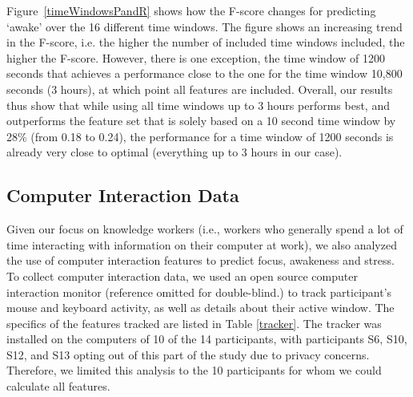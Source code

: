 Figure~\ref{timeWindowsPandR} shows how the F-score changes for predicting `awake' over the 16 different time windows. The figure shows an increasing trend in the F-score, i.e. the higher the number of included time windows included, the higher the F-score. However, there is one exception, the time window of 1200 seconds that achieves a performance close to the one for the time window 10,800 seconds (3 hours), at which point all features are included. Overall, our results thus show that while using all time windows up to 3 hours performs best, and outperforms the feature set that is solely based on a 10 second time window by 28\% (from 0.18 to 0.24), the performance for a time window of 1200 seconds is already very close to optimal (everything up to 3 hours in our case).






\subsection{Computer Interaction Data} \label{secCI}
Given our focus on knowledge workers (i.e., workers who generally spend a lot of time interacting with information on their computer at work), we also analyzed the use of computer interaction features to predict focus, awakeness and stress. To collect computer interaction data, we used an open source computer interaction monitor (reference omitted for double-blind.)
to track participant's mouse and keyboard activity, as well as details about their active window. The specifics of the features tracked are listed in Table \ref{tracker}. The tracker was installed on the computers of 10 of the 14 participants, with participants S6, S10, S12, and S13 opting out of this part of the study due to privacy concerns.  Therefore, we limited this analysis to the 10 participants for whom we could calculate all features. 

